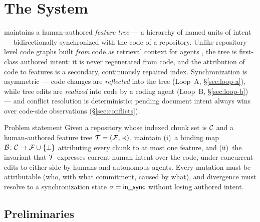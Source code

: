 %

\section{The \codoc{} System}
\label{sec:method}

\codoc{} maintains a human-authored \emph{feature tree} --- a hierarchy of named
units of intent --- bidirectionally synchronized with the code of a repository.
Unlike repository-level code graphs built \emph{from} code as retrieval context
for agents \citep{repograph2025,locagent2025,graphcoder2024,codexgraph2024}, the
tree is first-class authored intent: it is never regenerated from code, and the
attribution of code to features is a secondary, continuously repaired index.
Synchronization is asymmetric --- code changes are \emph{reflected} into the tree
(Loop~A, \S\ref{sec:loop-a}), while tree edits are \emph{realized} into code by a
coding agent (Loop~B, \S\ref{sec:loop-b}) --- and conflict resolution is
deterministic: pending document intent always wins over code-side observations
(\S\ref{sec:conflicts}).

\begin{problembox}{Problem statement}
Given a repository whose indexed chunk set is $\mathcal{C}$ and a human-authored feature
tree $\mathcal{T} = (\mathcal{F}, \prec)$, maintain (i)~a binding map
$\mathcal{B} \colon \mathcal{C} \to \mathcal{F} \cup \{\bot\}$ attributing every chunk to at most one
feature, and (ii)~the invariant that $\mathcal{T}$ expresses current human intent over
the code, under concurrent edits to either side by humans and autonomous
agents. Every mutation must be attributable (who, with what commitment, caused
by what), and divergence must resolve to a synchronization state
$\sigma = \textsf{in\_sync}$ without losing authored intent.
\end{problembox}

\subsection{Preliminaries}
\label{sec:prelim}

